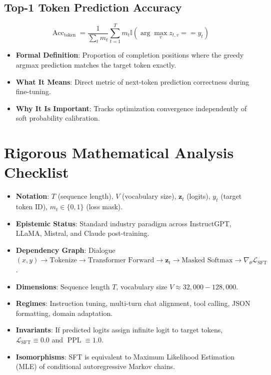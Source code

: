 \documentclass[11pt,a4paper]{article}
\theoremstyle{definition}
\begin{document}
\subsection{Top-1 Token Prediction Accuracy}
{\boldmath
\begin{equation}
\operatorname{Acc}_{\text{token}} = \frac{1}{\sum_t m_t} \sum_{t=1}^T m_t \mathbb{I}\left( \arg\max_{v} z_{t, v} == y_t \right)
\end{equation}
}
\begin{itemize}
    \item \textbf{Formal Definition}: Proportion of completion positions where the greedy argmax prediction matches the target token exactly.
    \item \textbf{What It Means}: Direct metric of next-token prediction correctness during fine-tuning.
    \item \textbf{Why It Is Important}: Tracks optimization convergence independently of soft probability calibration.
\end{itemize}

\section{Rigorous Mathematical Analysis Checklist}

\begin{itemize}
    \item \textbf{Notation}: $T$ (sequence length), $V$ (vocabulary size), $\mathbf{z}_t$ (logits), $y_t$ (target token ID), $m_t \in \{0, 1\}$ (loss mask).
    \item \textbf{Epistemic Status}: Standard industry paradigm across InstructGPT, LLaMA, Mistral, and Claude post-training.
    \item \textbf{Dependency Graph}: Dialogue $(x, y) \to \text{Tokenize} \to \text{Transformer Forward} \to \mathbf{z}_t \to \text{Masked Softmax} \to \nabla_\theta \mathcal{L}_{\text{SFT}}$.
    \item \textbf{Dimensions}: Sequence length $T$, vocabulary size $V \approx 32{,}000 - 128{,}000$.
    \item \textbf{Regimes}: Instruction tuning, multi-turn chat alignment, tool calling, JSON formatting, domain adaptation.
    \item \textbf{Invariants}: If predicted logits assign infinite logit to target tokens, $\mathcal{L}_{\text{SFT}} \equiv 0.0$ and $\operatorname{PPL} \equiv 1.0$.
    \item \textbf{Isomorphisms}: SFT is equivalent to Maximum Likelihood Estimation (MLE) of conditional autoregressive Markov chains.
\end{itemize}
\end{document}
